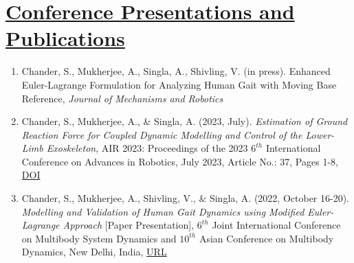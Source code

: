 \section{\underline{Conference Presentations and Publications}}
\begin{enumerate}
	\item Chander, S., Mukherjee, A., Singla, A., Shivling, V. (in press). Enhanced Euler-Lagrange Formulation for Analyzing Human Gait with Moving Base Reference, \emph{Journal of Mechanisms and Robotics}
	\item Chander, S., Mukherjee, A., \& Singla, A. (2023, July). \emph{Estimation of Ground Reaction Force for Coupled Dynamic Modelling and Control of the Lower-Limb Exoskeleton}, AIR 2023: Proceedings of the 2023 $6^{th}$ International Conference on Advances in Robotics, July 2023, Article No.: 37, Pages 1-8, \href{https://doi.org/10.1145/3610419.3610456  }{\large{DOI}}\\
	\item Chander, S., Mukherjee, A., Shivling, V., \& Singla, A. (2022, October 16-20). \emph{Modelling and Validation of Human Gait Dynamics using Modified Euler-Lagrange Approach} [Paper Presentation], $6^{th}$ Joint International Conference on Multibody System Dynamics and $10^{th}$ Asian Conference on Multibody Dynamics, New Delhi, India, \href{http://imsdacmd2020.iitd.ac.in/web-abstracts/pdf/WEB_ABSTRACTS/IMSDACMD2020_219.pdf}{\large{URL}}
\end{enumerate}

